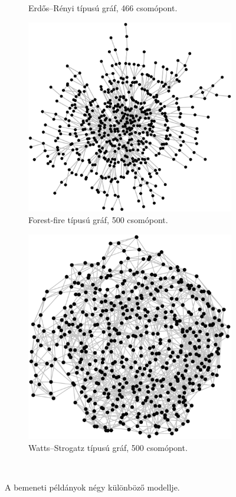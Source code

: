 \begin{figure}[ht]
\begin{subfigure}[b]{0.5\linewidth}
    \caption{ Erdős–Rényi típusú gráf, 466 csomópont. }
    \label{fig:ERDOS_RENYI_MODEL}
    \vspace{4ex}
  \end{subfigure}
  \begin{subfigure}[b]{0.5\linewidth}
    \centering
    \includegraphics[width=1.15\linewidth]{images/forest_fire_model.png}
    \caption{ Forest-fire típusú gráf, 500 csomópont. }
    \label{fig:FOREST_FIRE_MODEL}
  \end{subfigure}%
  \begin{subfigure}[b]{0.5\linewidth}
    \centering
    \includegraphics[width=0.85\linewidth]{images/watts_strogatz_model.png}
    \caption{ Watts–Strogatz típusú gráf, 500 csomópont. }
    \label{fig:WATTS_STROGATZ_MODEL}
  \end{subfigure}\\
  \caption{A bemeneti példányok négy különböző modellje.}
  \label{fig:BENCHMARK_INSTANCES}
\end{figure}
